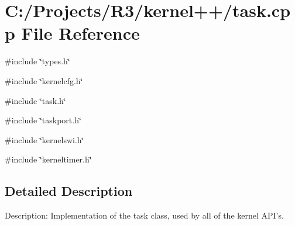 \section{C:/Projects/R3/kernel++/task.cpp File Reference}
\label{task_8cpp}
{\ttfamily \#include \char`\"{}types.h\char`\"{}}\par
{\ttfamily \#include \char`\"{}kernelcfg.h\char`\"{}}\par
{\ttfamily \#include \char`\"{}task.h\char`\"{}}\par
{\ttfamily \#include \char`\"{}taskport.h\char`\"{}}\par
{\ttfamily \#include \char`\"{}kernelswi.h\char`\"{}}\par
{\ttfamily \#include \char`\"{}kerneltimer.h\char`\"{}}\par


\subsection{Detailed Description}
Description: Implementation of the task class, used by all of the kernel API's. 